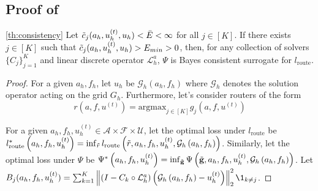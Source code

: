 \documentclass{article}
\begin{document}
\subsection{Proof of } \label{sec:proofconsistency}

\begin{customtheorem}{\ref{th:consistency}}
    Let $\Tilde{c}_j(a_h, u^{(t)}_h, u_h) < \Bar{E} < \infty$  for all $j \in [K]$. If there exists $j\in [K]$ such that $\Tilde{c}_j(a_h, u^{(t)}_h, u_h) > E_{min} > 0$, then, for any collection of solvers $\{C_j\}_{j= 1}^K$ and linear discrete operator $\mathcal{L}_h^a$, $\Psi$ is Bayes consistent surrogate for $l_{\text{route}}$.
\end{customtheorem}

\begin{proof}

For a given $a_h, f_h$, let $u_h$ be $\mathcal{G}_h\left(a_h, f_h\right)$ where $\mathcal{G}_h$ denotes the solution operator acting on the grid $G_h$. Furthermore, let's consider routers of the form
\begin{equation*}
    r(a, f, u^{(t)}) = \text{argmax}_{j \in [K]} g_j(a, f, u^{(t)})
\end{equation*}

For a given $a_h, f_h, u_h^{(t)} \in \mathcal{A} \times \mathcal{F} \times \mathcal{U}$, let the optimal loss under $l_{\text{route}}$ be $l_{\text{route}}^*\left(a_h, f_h, u^{(t)}_h\right) = \inf_{\Tilde{r}} l_{\text{route}}\left(\tilde{r}, a_h, f_h, u^{(t)}_h, \mathcal{G}_h\left(a_h, f_h\right)\right)$. Similarly, let the optimal loss under $\Psi$ be $\Psi^*\left(a_h, f_h, u^{(t)}_h\right) = \inf_{\Tilde{\mathbf{g}}} \Psi\left(\tilde{\mathbf{g}}, a_h, f_h, u^{(t)}_h, \mathcal{G}_h\left(a_h, f_h\right)\right)$. Let $B_j(a_h, f_h, u^{(t)}_h) = \sum_{k = 1}^K\left\|\left( I - C_{k} \circ \mathcal{L}_{h}^a\right)\left(\mathcal{G}_h\left(a_h, f_h\right) - u^{(t)}_h\right)\right\|^2_2\1_{k\neq j}$.


\end{proof}
\end{document}
